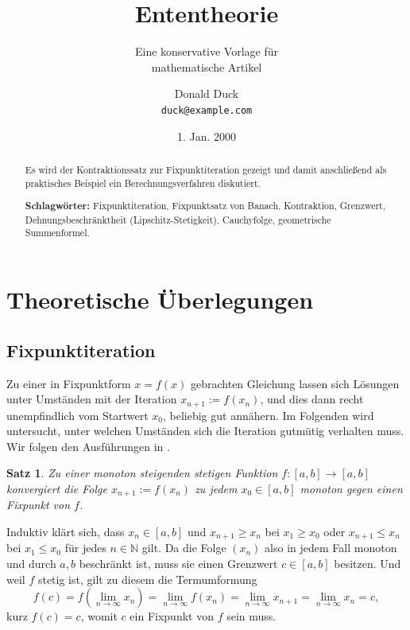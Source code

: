 \documentclass[
  a4paper, 11pt, fleqn, twoside,
  abstract=true
]{scrartcl}
\title{Ententheorie}
\subtitle{Eine konservative Vorlage für\\ mathematische Artikel}
\author{Donald Duck\\ \large\texttt{duck@example.com}}
\date{1. Jan. 2000}
\makeatletter
\renewenvironment{proof}[1][\proofname]{\par
  \normalfont\topsep2\p@\@plus2\p@\relax
  \trivlist
  \item[\hskip\labelsep\bfseries #1\@addpunct{.}]\ignorespaces
}{\endtrivlist\@endpefalse}
\theoremstyle{plain}
\newtheorem{theorem}{Satz}[section]
\theoremstyle{definition}
\newcommand{\strong}[1]{\textbf{#1}}
\newcommand{\keywords}[1]{%
  \vspace{0.6em}\noindent\strong{Schlagwörter:} #1}
\newcommand{\N}{\mathbb N}
\makeatother
\begin{document}
\maketitle

\begin{abstract}\noindent
Es wird der Kontraktionssatz zur Fixpunktiteration gezeigt und damit
anschließend als praktisches Beispiel ein Berechnungsverfahren
diskutiert.

\keywords{Fixpunktiteration, Fixpunktsatz von Banach,
Kontraktion, Grenzwert, Dehnungsbeschränktheit (Lipschitz-Stetigkeit),
Cauchyfolge, geometrische Summenformel.}
\end{abstract}

\tableofcontents

\section{Theoretische Überlegungen}

\subsection{Fixpunktiteration}

Zu einer in Fixpunktform $x=f(x)$ gebrachten Gleichung lassen sich
Lösungen unter Umständen mit der Iteration $x_{n+1} := f(x_n)$, und
dies dann recht unempfindlich vom Startwert $x_0$, beliebig gut annähern.
Im Folgenden wird untersucht, unter welchen Umständen sich die Iteration
gutmütig verhalten muss. Wir folgen den Ausführungen in \cite{Heuser1}.

\begin{theorem}
Zu einer monoton steigenden stetigen Funktion $f\colon [a,b]\to [a,b]$
konvergiert die Folge $x_{n+1} := f(x_n)$ zu jedem $x_0\in [a,b]$ monoton
gegen einen Fixpunkt von $f$.
\end{theorem}

\begin{proof}
Induktiv klärt sich, dass $x_n\in [a,b]$ und $x_{n+1}\ge x_n$ bei
$x_1\ge x_0$ oder $x_{n+1}\le x_n$ bei $x_1\le x_0$ für jedes
$n\in\N$ gilt. Da die Folge $(x_n)$ also in jedem Fall monoton und durch
$a,b$ beschränkt ist, muss sie einen Grenzwert $c\in [a,b]$ besitzen.
Und weil $f$ stetig ist, gilt zu diesem die Termumformung
\[f(c) = f(\lim_{n\to\infty} x_n) = \lim_{n\to\infty} f(x_n) =
\lim_{n\to\infty} x_{n+1} = \lim_{n\to\infty} x_n = c,\]
kurz $f(c) = c$, womit $c$ ein Fixpunkt von $f$ sein muss.\,\qedsymbol
\end{proof}
\end{document}
